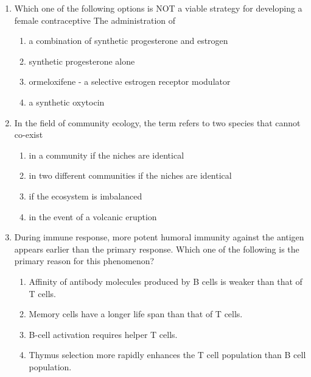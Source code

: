 \documentclass[journal,12pt,onecolumn]{IEEEtran}
\theoremstyle{remark}
\begin{document}
\begin{enumerate}
\hfill{}

\begin{enumerate}
\end{enumerate}

\item Which one of the following options is NOT a viable strategy for developing a female contraceptive\brak{} The administration of

\hfill{}

\begin{enumerate}
\item a combination of synthetic progesterone and estrogen
\item synthetic progesterone alone
\item ormeloxifene - a selective estrogen receptor modulator
\item a synthetic oxytocin
\end{enumerate}

\item In the field of community ecology, the term  refers to two species that cannot co-exist

\hfill{}

\begin{enumerate}
\item in a community if the niches are identical
\item in two different communities if the niches are identical
\item if the ecosystem is imbalanced
\item in the event of a volcanic eruption
\end{enumerate}

  \item During immune response, more potent humoral immunity against the antigen appears earlier than the primary response. Which one of the following is the primary reason for this phenomenon?

    \hfill{}
    \begin{enumerate}
        \item Affinity of antibody molecules produced by B cells is weaker than that of T cells.
        \item Memory cells have a longer life span than that of T cells.
        \item B-cell activation requires helper T cells.
        \item Thymus selection more rapidly enhances the T cell population than B cell population.
    \end{enumerate}


\end{enumerate}
\end{document}
